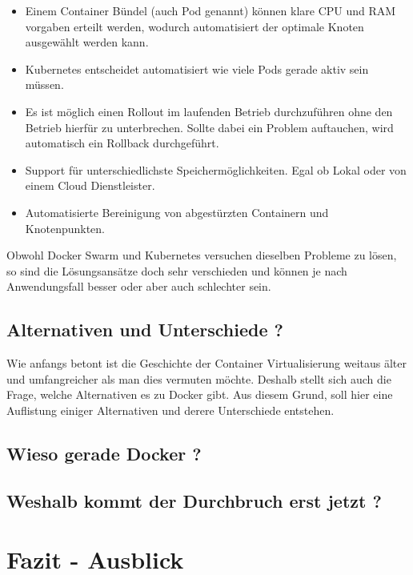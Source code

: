 \documentclass[12pt,toc=bib,toc=listof]{scrreprt}
\begin{document}
\begin{itemize}
	\item Einem Container Bündel (auch Pod genannt) können klare CPU und RAM vorgaben erteilt werden, wodurch automatisiert der optimale Knoten ausgewählt werden kann.
	\item Kubernetes entscheidet automatisiert wie viele Pods gerade aktiv sein müssen.
	\item Es ist möglich einen Rollout im laufenden Betrieb durchzuführen ohne den Betrieb hierfür zu unterbrechen. Sollte dabei ein Problem auftauchen, wird automatisch ein Rollback durchgeführt.
	\item Support für unterschiedlichste Speichermöglichkeiten. Egal ob Lokal oder von einem Cloud Dienstleister.
	\item Automatisierte Bereinigung von abgestürzten Containern und Knotenpunkten.
\end{itemize}
Obwohl Docker Swarm und Kubernetes versuchen dieselben Probleme zu lösen, so sind die Lösungsansätze doch sehr verschieden und können je nach Anwendungsfall besser oder aber auch schlechter sein.

\section{Alternativen und Unterschiede ?}
Wie anfangs betont ist die Geschichte der Container Virtualisierung weitaus älter und umfangreicher als man dies vermuten möchte.
Deshalb stellt sich auch die Frage, welche Alternativen es zu Docker gibt.
Aus diesem Grund, soll hier eine Auflistung einiger Alternativen und derere Unterschiede entstehen.






\section{Wieso gerade Docker ?}


\section{Weshalb kommt der Durchbruch erst jetzt ?}

\chapter{Fazit - Ausblick} %
\label{sec:fazit}
\end{document}
